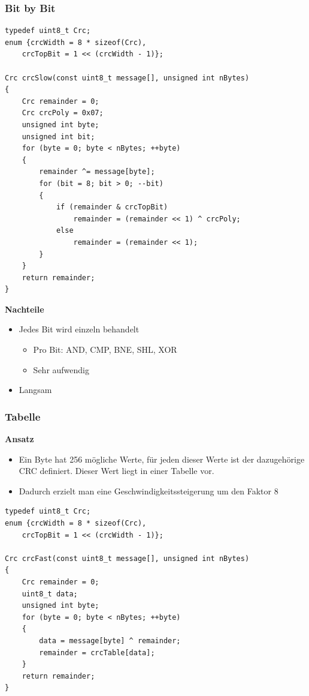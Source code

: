 \subsubsection{Bit by Bit}
\begin{lstlisting}[style=C]
typedef uint8_t Crc;
enum {crcWidth = 8 * sizeof(Crc),
	crcTopBit = 1 << (crcWidth - 1)};
	
Crc crcSlow(const uint8_t message[], unsigned int nBytes)
{
	Crc remainder = 0;
	Crc crcPoly = 0x07;
	unsigned int byte;
	unsigned int bit;
	for (byte = 0; byte < nBytes; ++byte)
	{
		remainder ^= message[byte];
		for (bit = 8; bit > 0; --bit)
		{
			if (remainder & crcTopBit)
				remainder = (remainder << 1) ^ crcPoly;
			else
				remainder = (remainder << 1);
		}
	}
	return remainder;
}
\end{lstlisting}

\textbf{Nachteile}
\begin{itemize}
	\item Jedes Bit wird einzeln behandelt
	\begin{itemize}
		\item Pro Bit: AND, CMP, BNE, SHL, XOR
		\item Sehr aufwendig	
	\end{itemize}
	\item Langsam
\end{itemize}


\subsubsection{Tabelle}
\textbf{Ansatz}
\begin{itemize}
	\item Ein Byte hat 256 mögliche Werte, für jeden dieser Werte ist der dazugehörige CRC definiert. Dieser Wert liegt in einer Tabelle vor.
	\item Dadurch erzielt man eine Geschwindigkeitssteigerung um den Faktor 8	
\end{itemize}

\begin{lstlisting}[style=C]
typedef uint8_t Crc;
enum {crcWidth = 8 * sizeof(Crc),
	crcTopBit = 1 << (crcWidth - 1)};
	
Crc crcFast(const uint8_t message[], unsigned int nBytes)
{
	Crc remainder = 0;
	uint8_t data;
	unsigned int byte;
	for (byte = 0; byte < nBytes; ++byte)
	{
		data = message[byte] ^ remainder;
		remainder = crcTable[data];
	}
	return remainder;
}
\end{lstlisting}
